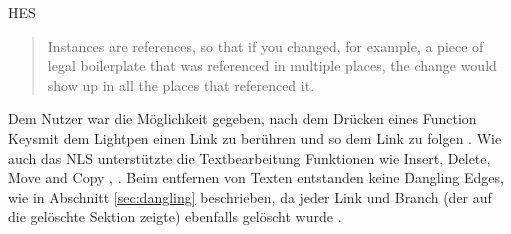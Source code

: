 \begin{section}{HES}
\begin{quote}
\glqq Instances are references, so that if you changed, for example, a piece of legal boilerplate that was referenced in multiple places, the change would show up in all the places that referenced it. \grqq{ }\cite{Dam1988}
\end{quote}

Dem Nutzer war die Möglichkeit gegeben, nach dem Drücken eines \glqq Function Keys\grqq{ }mit dem Lightpen einen Link zu berühren und so dem Link zu folgen \cite[S.23]{Dam1969}. Wie auch das NLS unterstützte die Textbearbeitung Funktionen wie Insert, Delete, Move and Copy \cite[S.10-14]{Dam1969}, \cite[S. 889]{Dam1988}. Beim entfernen von Texten entstanden keine Dangling Edges, wie in Abschnitt \ref{sec:dangling} beschrieben, da jeder Link und Branch (der auf die gelöschte Sektion zeigte) ebenfalls gelöscht wurde \cite[S.12]{Dam1969}.

\end{section}

